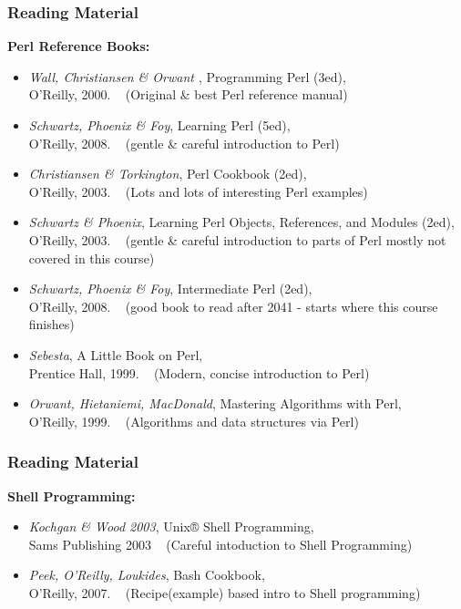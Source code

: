 \begin{frame}[shrink]
\frametitle{Reading Material}
{\bf{Perl Reference Books:}}
\begin{itemize}
\item  {\em{Wall, Christiansen \& Orwant }},
	Programming Perl (3ed),
	\\{\small O'Reilly, 2000.
		~ (Original \& best Perl reference manual)}
\item  {\em{Schwartz, Phoenix \& Foy}},
	Learning Perl (5ed),
	\\{\small O'Reilly, 2008.
		~ (gentle \&  careful introduction to Perl)}
\item  {\em{Christiansen \& Torkington}},
	Perl Cookbook (2ed),
	\\{\small O'Reilly, 2003.
		~ (Lots and lots of interesting Perl examples)}
\item  {\em{Schwartz \& Phoenix}},
	Learning Perl Objects, References, and Modules (2ed),
	\\{\small O'Reilly, 2003.
		~ (gentle \&  careful introduction to parts of Perl mostly  not covered in this course)}
\item  {\em{Schwartz, Phoenix \& Foy}},
	Intermediate Perl  (2ed),
	\\{\small O'Reilly, 2008.
		~ (good book to read after 2041 - starts where this course finishes)}
\item  {\em{Sebesta}},
	A Little Book on Perl,
	\\{\small Prentice Hall, 1999.
		~ (Modern, concise introduction to Perl)}
\item  {\em{Orwant, Hietaniemi, MacDonald}},
	Mastering Algorithms with Perl,
	\\{\small O'Reilly, 1999.
		~ (Algorithms and data structures via Perl)}
\end{itemize}
\end{frame}

\begin{frame}
\frametitle{Reading Material}
{\bf{Shell Programming:}}
\begin{itemize}
\item  {\em{Kochgan \& Wood 2003}},
	Unix® Shell Programming,
	\\{\small Sams Publishing 2003
		~ (Careful intoduction to Shell Programming)} 
\item  {\em{Peek, O'Reilly, Loukides}},
	Bash Cookbook,
	\\{\small O'Reilly, 2007.
		~ (Recipe(example) based intro to Shell programming)}
\end{itemize}
\end{frame}

